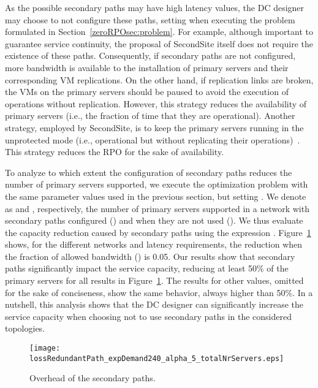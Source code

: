 \documentclass[preprint]{elsarticle}
\begin{document}
As the possible secondary paths may have high latency values, the DC designer may choose to not configure these paths, setting  when executing the problem formulated in Section~\ref{zeroRPOsec:problem}. For example, although important to guarantee service continuity, the proposal of SecondSite itself does not require the existence of these paths. Consequently, if secondary paths are not configured, more bandwidth is available to the installation of primary servers and their corresponding VM replications. On the other hand, if replication links are broken, the VMs on the primary servers should be paused to avoid the execution of operations without replication. However, this strategy reduces the availability of primary servers (i.e., the fraction of time that they are operational). Another strategy, employed by SecondSite, is to keep the primary servers running in the unprotected mode (i.e., operational but without replicating their operations)~\cite{rajagopalan2012secondsite}. This strategy reduces the RPO for the sake of availability.

To analyze to which extent the configuration of secondary paths reduces the number of primary servers supported, we execute the optimization problem with the same parameter values used in the previous section, but setting . We denote as  and , respectively, the number of primary servers supported in a network with secondary paths configured () and when they are not used (). We thus evaluate the capacity reduction caused by secondary paths using the expression . Figure~\ref{zeroRPOfig:comparisonWithoutRedundantServiceReduction} shows, for the different networks and latency requirements, the reduction when the fraction of allowed bandwidth () is 0.05. Our results show that secondary paths significantly impact the service capacity, reducing at least 50\% of the primary servers for all results in Figure~\ref{zeroRPOfig:comparisonWithoutRedundantServiceReduction}. The results for other  values, omitted for the sake of conciseness, show the same behavior, always higher than 50\%. In a nutshell, this analysis shows that the DC designer can significantly increase the service capacity when choosing not to use secondary paths in the considered topologies.
\begin{figure}
\centering
\texttt{[image: lossRedundantPath\_expDemand240\_alpha\_5\_totalNrServers.eps]}
\caption{Overhead of the secondary paths.}
\label{zeroRPOfig:comparisonWithoutRedundantServiceReduction}
\end{figure} 
\end{document}
